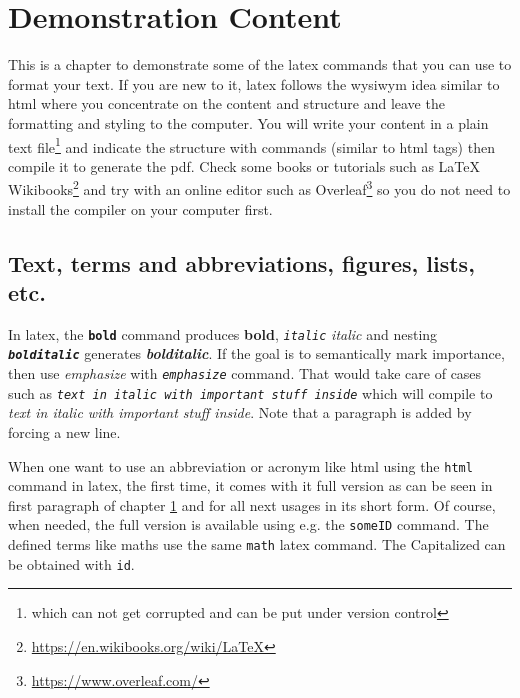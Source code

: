 \vspace{21.5pt}
\chapter{Demonstration Content}\label{demo:content}

This is a chapter to demonstrate some of the \gls{latex} commands that you can use to format your text. If you are new to it, \gls{latex} follows the \gls{wysiwym} idea similar to \gls{html} where you concentrate on the content and structure and leave the formatting and styling to the computer. You will write your content in a plain text file\footnote{which can not get corrupted and can be put under version control} and indicate the structure with commands (similar to \gls{html} tags) then compile it to generate the pdf. Check some books or tutorials such as \LaTeX{} Wikibooks\footnote{\url{https://en.wikibooks.org/wiki/LaTeX}} and try with an online editor such as Overleaf\footnote{\url{https://www.overleaf.com/}} so you do not need to install the compiler on your computer first.

\section{Text, terms and abbreviations, figures, lists, etc.}

In \gls{latex}, the \texttt{\textbf{bold}} command produces \textbf{bold}, \texttt{\textit{italic}}  \textit{italic} and nesting \texttt{\textbf{\textit{bolditalic}}} generates \textbf{\textit{bolditalic}}. If the goal is to semantically mark importance, then use \emph{emphasize} with \texttt{\emph{emphasize}} command. That would take care of cases such as \texttt{\textit{text in italic with \emph{important stuff} inside}} which will compile to \textit{text in italic with \emph{important stuff} inside}. Note that a paragraph is added by forcing a new line.

When one want to use an abbreviation or acronym like \gls{html} using the \texttt{\gls{html}} command in \gls{latex}, the first time, it comes with it full version as can be seen in first paragraph of chapter \ref{demo:content} and for all next usages in its short form. Of course, when needed, the full version is available using e.g. the \texttt{\acrlong{someID}} command. The defined terms like \gls{maths} use the same \texttt{\gls{math}} \gls{latex} command. The Capitalized can be obtained with \texttt{\Gls{id}}.

